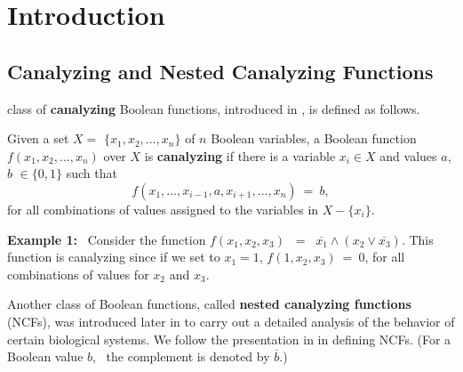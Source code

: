 \section{Introduction} 
\label{sec:intro}

\subsection{Canalyzing and Nested Canalyzing Functions}
\label{sse:ncf_def}

 class of \textbf{canalyzing} Boolean functions, introduced 
in \cite{Kauffman-1969}, is defined as follows.

\begin{definition}\label{def:canalyzing}
Given a set $X = $ $\{x_1, x_2, \ldots, x_n\}$ of $n$  Boolean variables,
a Boolean function $f(x_1, x_2, \ldots, x_n)$ over $X$ is \textbf{canalyzing}
if there is a variable $x_i \in X$ and values $a$, $b$ $\in \{0,1\}$ such that
\[
f(x_1, \ldots, x_{i-1}, a, x_{i+1}, \ldots, x_n) ~=~ b, 
\]
for all combinations of values assigned to the variables in $X - \{x_i\}$.
\end{definition}

\medskip

\noindent
\textbf{Example 1:}~ Consider the function 
$f(x_1, x_2, x_3)$ $~=~$ $\overline{x_1} \wedge (x_2 \vee \overline{x_3})$.
This function is canalyzing since if we set to $x_1 = 1$,
$f(1, x_2, x_3) ~=~ 0$, for all combinations of values for 
$x_2$ and $x_3$. %

\medskip

Another class of Boolean functions, called \textbf{nested canalyzing functions} (NCFs),
was introduced later in \cite{Kauffman-etal-2003} to carry out a detailed
analysis of the behavior of certain biological systems.
We follow the presentation in \cite{Layne-2011} in defining NCFs.
(For a Boolean value $b$,~ the complement is denoted by $\overline{b}$.)

